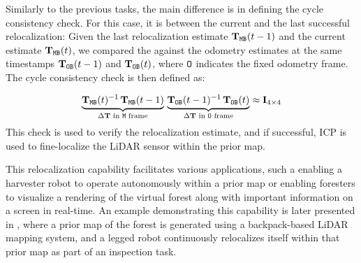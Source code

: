 Similarly to the previous tasks, the main difference is in defining the cycle consistency check. For this case, it is between the current and the last successful relocalization: Given the last relocalization estimate $\mathbf{T}_{\mathtt{M}\mathtt{B}}(t-1)$ and the current estimate $\mathbf{T}_{\mathtt{M}\mathtt{B}}(t)$, we compared the  against the odometry estimates at the same timestamps $\mathbf{T}_{\mathtt{O}\mathtt{B}}(t-1)$ and $\mathbf{T}_{\mathtt{O}\mathtt{B}}(t)$, where $\mathtt{O}$ indicates the fixed odometry frame. The cycle consistency check is then defined as:

\begin{equation}
  \label{eq:cycle-relocalization}
  \underbrace{\mathbf{T}_{\mathtt{M}\mathtt{B}}(t)^{-1}\, \mathbf{T}_{\mathtt{M}\mathtt{B}}(t-1)}_{\Delta\mathbf{T} \text{ in $\mathtt{M}$ frame}}  \, \underbrace{ \mathbf{T}_{\mathtt{O}\mathtt{B}}(t-1)^{-1}\,  \mathbf{T}_{\mathtt{O}\mathtt{B}}(t)}_{\Delta\mathbf{T} \text{ in $\mathtt{O}$ frame}} \approx \mathbf{I}_{4\times4}
\end{equation}
This check is used to verify the relocalization estimate, and if successful, ICP is used to fine-localize the LiDAR sensor within the prior map.

This relocalization capability facilitates various applications, such a enabling a harvester robot to operate autonomously within a prior map or enabling foresters to visualize a rendering of the virtual forest along with important information on a screen in real-time. An example demonstrating this capability is later presented in , where a prior map of the forest is generated using a backpack-based LiDAR mapping system, and a legged robot continuously relocalizes itself within that prior map as part of an inspection task.

